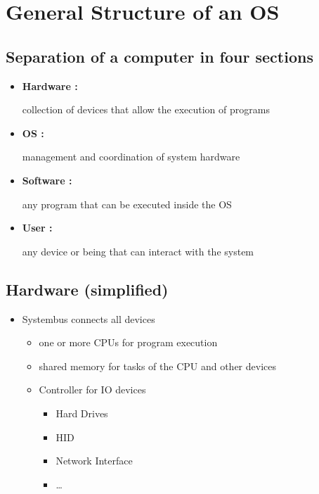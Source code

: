 \documentclass[
]{article}
\author{}
\date{}
\providecommand{\tightlist}{%
  \setlength{\itemsep}{0pt}\setlength{\parskip}{0pt}}
\begin{document}
\hypertarget{general-structure-of-an-os}{%
\section{General Structure of an OS}\label{general-structure-of-an-os}}

\hypertarget{separation-of-a-computer-in-four-sections}{%
\subsection{Separation of a computer in four
sections}\label{separation-of-a-computer-in-four-sections}}

\begin{itemize}
\item
  \textbf{Hardware :}

  collection of devices that allow the execution of programs
\item
  \textbf{OS :}

  management and coordination of system hardware
\item
  \textbf{Software :}

  any program that can be executed inside the OS
\item
  \textbf{User :}

  any device or being that can interact with the system
\end{itemize}

\hypertarget{hardware-simplified}{%
\subsection{Hardware (simplified)}\label{hardware-simplified}}

\begin{itemize}
\tightlist
\item
  Systembus connects all devices

  \begin{itemize}
  \tightlist
  \item
    one or more CPUs for program execution
  \item
    shared memory for tasks of the CPU and other devices
  \item
    Controller for IO devices

    \begin{itemize}
    \tightlist
    \item
      Hard Drives
    \item
      HID
    \item
      Network Interface
    \item
      \ldots{}
    \end{itemize}
  \end{itemize}
\end{itemize}
\end{document}
